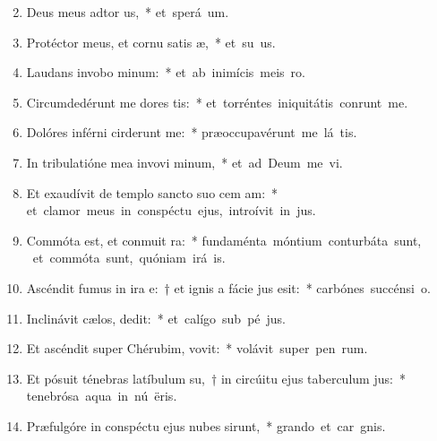 \begin{flushleft}
\begin{enumerate}[leftmargin=*]
\setcounter{enumi}{1}

\item Deus meus adtor us,~* \mbox{et sperá  um.}
\item Protéctor meus, et cornu satis æ,~* \mbox{et su us.}
\item Laudans invobo minum:~* \mbox{et ab inimícis meis  ro.}
\item Circumdedérunt me dores tis:~* \mbox{et torréntes iniquitátis conrunt me.}
\item Dolóres inférni cirderunt me:~* \mbox{præoccupavérunt me lá tis.}
\item In tribulatióne mea invovi minum,~* \mbox{et ad Deum me vi.}
\item Et exaudívit de templo sancto suo cem am:~* \mbox{et clamor meus in conspéctu ejus, introívit in  jus.}
\item Commóta est, et conmuit ra:~* \mbox{fundaménta móntium conturbáta sunt,} \mbox{ et commóta sunt, quóniam irá  is.}
\item Ascéndit fumus in ira e:~† et ignis a fácie jus esit:~* \mbox{carbónes succénsi   o.}
\item Inclinávit cælos,  dedit:~* \mbox{et calígo sub pé jus.}
\item Et ascéndit super Chérubim,  vovit:~* \mbox{volávit super pen rum.}
\item Et pósuit ténebras latíbulum su,~† in circúitu ejus taberculum jus:~* \mbox{tenebrósa aqua in nú ëris.}
\item Præfulgóre in conspéctu ejus nubes sirunt,~* \mbox{grando et car gnis.}

\end{enumerate}
\end{flushleft}
